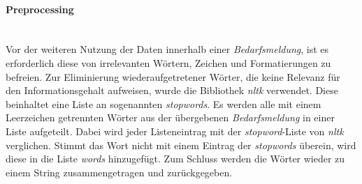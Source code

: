 \paragraph{Preprocessing}\mbox{}\\
Vor der weiteren Nutzung der Daten innerhalb einer \emph{Bedarfsmeldung}, ist es erforderlich diese von irrelevanten Wörtern, Zeichen und Formatierungen zu befreien.%
Zur Eliminierung wiederaufgetretener Wörter, die keine Relevanz für den Informationsgehalt aufweisen, wurde die Bibliothek \emph{nltk} verwendet. Diese beinhaltet eine Liste an sogenannten \emph{stopwords}.
Es werden alle mit einem Leerzeichen getrennten Wörter aus der übergebenen \emph{Bedarfsmeldung} in einer Liste aufgeteilt. Dabei wird jeder Listeneintrag mit der \emph{stopword}-Liste von \emph{nltk} verglichen. Stimmt das Wort nicht mit einem Eintrag der \emph{stopwords} überein, wird diese in die Liste \emph{words} hinzugefügt. Zum Schluss werden die Wörter wieder zu einem String zusammengetragen und zurückgegeben. \\

